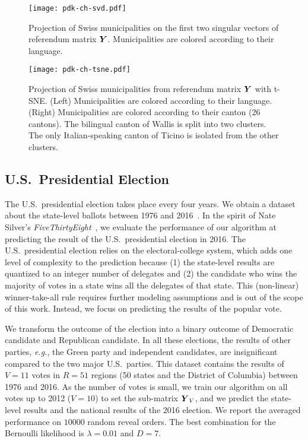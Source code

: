 \begin{figure}
	\centering
	\texttt{[image: pdk-ch-svd.pdf]}
	\caption{
		Projection of Swiss municipalities on the first two singular vectors of referendum matrix $\mbox{$\mbox{$\boldsymbol{Y}$}$}$.
		Municipalities are colored according to their language.
	}
	\label{pdk:fig:ch_svd}
\end{figure}

\begin{figure}
	\centering
	\texttt{[image: pdk-ch-tsne.pdf]}
	\caption{
		Projection of Swiss municipalities from referendum matrix $\mbox{$\mbox{$\boldsymbol{Y}$}$}$ with t-SNE.
		(Left) Municipalities are colored according to their language.
		(Right) Municipalities are colored according to their canton (26 cantons).
		The bilingual canton of Wallis is split into two clusters.
		The only Italian-speaking canton of Ticino is isolated from the other clusters.
	}
	\label{pdk:fig:ch_tsne}
\end{figure}

\subsection{U.S.\ Presidential Election}

The U.S.\ presidential election takes place every four years.
We obtain a dataset about the state-level ballots between 1976 and 2016~\citep{mit2017us}.
In the spirit of Nate Silver's \textit{FiveThirtyEight}~\citep{silver2008pollster}, we evaluate the performance of our algorithm at predicting the result of the U.S.\ presidential election in 2016.
The U.S.\ presidential election relies on the electoral-college system, which adds one level of complexity to the prediction because (1) the state-level results are quantized to an integer number of delegates and (2) the candidate who wins the majority of votes in a state wins all the delegates of that state.
This (non-linear) winner-take-all rule requires further modeling assumptions and is out of the scope of this work.
Instead, we focus on predicting the results of the popular vote.

We transform the outcome of the election into a binary outcome of Democratic candidate and Republican candidate.
In all these elections, the results of other parties, \textit{e.g.}, the Green party and independent candidates, are insignificant compared to the two major U.S.\ parties.
This dataset contains the results of $V = 11$ votes in $R = 51$ regions (50 states and the District of Columbia) between 1976 and 2016.
As the number of votes is small, we train our algorithm on all votes up to 2012 ($V = 10$) to set the sub-matrix $\mbox{$\mbox{$\boldsymbol{Y}$}$}_V$, and we predict the state-level results and the national results of the 2016 election.
We report the averaged performance on $10000$ random reveal orders.
The best combination for the Bernoulli likelihood is $\lambda = 0.01 $ and $D = 7$.

